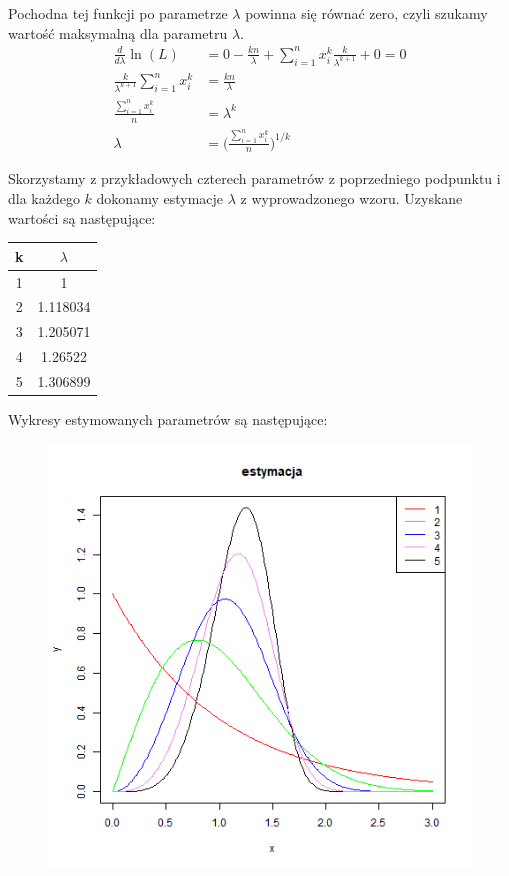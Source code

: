 \documentclass{article}
\begin{document}
Pochodna tej funkcji po parametrze $\lambda$ powinna się równać zero, czyli szukamy wartość maksymalną dla parametru $\lambda$.
\begin{align*}
\frac{d}{d\lambda} \ln(L) & = 0 - \frac{kn}{\lambda} + \sum_{i=1}^n x_i^k \frac{k}{\lambda^{k+1}} + 0 = 0 \\
\frac{k}{\lambda^{k+1}} \sum_{i=1}^n x_i^k  & = \frac{kn}{\lambda} \\
\frac{\sum_{i=1}^n x_i^k}{n} & = \lambda^k \\
\lambda & = \Big( \frac{\sum_{i=1}^n x_i^k}{n} \Big)^{1/k}
\end{align*}

Skorzystamy z przykładowych czterech parametrów z poprzedniego podpunktu i dla każdego $k$ dokonamy estymacje $\lambda$ z wyprowadzonego wzoru.
Uzyskane wartości są następujące: \\
\begin{center}
\begin{tabular}{|c|c|}
\hline
k & $\lambda$ \\ \hline
1 & 1 \\ \hline
2 & 1.118034 \\ \hline
3 & 1.205071 \\ \hline 
4 & 1.26522 \\ \hline
5 & 1.306899 \\ \hline
\end{tabular}
\end{center}

\newpage
Wykresy estymowanych parametrów są następujące:
\begin{figure}[h!]
\begin{center}
\includegraphics[height = 0.5\textheight, angle = 0]{"kolosWy.png"}
\end{center}
\end{figure}
\end{document}
